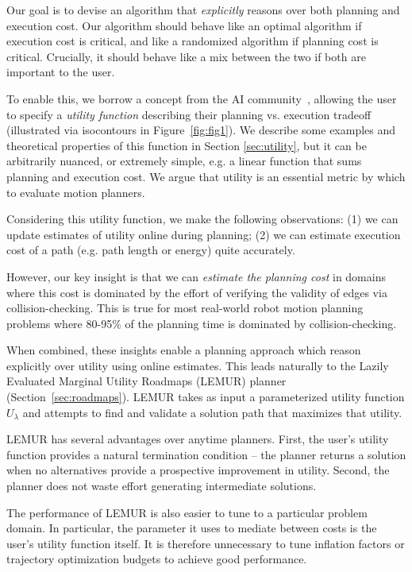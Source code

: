 Our goal is to devise an algorithm that \emph{explicitly} reasons over both planning
and execution cost. Our algorithm should behave like an optimal algorithm 
if execution cost is critical, and like a randomized algorithm if planning
cost is critical. Crucially, it should behave like a mix between the two 
if both are important to the user.

To enable this, we borrow a concept from the AI community~\citep{ruml2007bugsy},
allowing the user to specify a \emph{utility function} describing
their planning vs. execution tradeoff
(illustrated via isocontours in Figure~\ref{fig:fig1}).
We describe some examples and theoretical properties of this
function in Section \ref{sec:utility}, but it can be arbitrarily nuanced, 
or extremely simple,
e.g. a linear function that sums planning and execution cost.
We argue that utility is an essential metric
by which to evaluate motion planners.

Considering this utility function, we make the following observations: 
(1) we can update estimates of utility online during planning;
(2) we can estimate execution cost of a path
(e.g. path length or energy) quite accurately.

However, our key insight is that we can
\emph{estimate the planning cost} in domains
where this cost is dominated by the effort of
verifying the validity of edges via collision-checking.
This is true for most real-world robot motion planning problems
where 80-95\% of the planning time
is dominated by collision-checking.

When combined, these insights enable a planning approach which
reason explicitly over utility using online estimates.
This leads naturally to the
Lazily Evaluated Marginal Utility Roadmaps (LEMUR) planner
(Section~\ref{sec:roadmaps}).
LEMUR takes as input a parameterized utility function $U_\lambda$ 
and attempts to find and validate a solution path
that maximizes that utility.

LEMUR has several advantages over anytime planners.
First,
the user's utility function provides a natural termination condition
-- the planner returns a solution when no alternatives provide
a prospective improvement in utility.
Second, the planner does not waste effort generating
intermediate solutions.

The performance of LEMUR is also easier to tune to a particular
problem domain.
In particular,
the parameter it uses to mediate between costs is
the user's utility function itself.
It is therefore unnecessary to tune inflation factors or
trajectory optimization budgets to achieve good performance.

